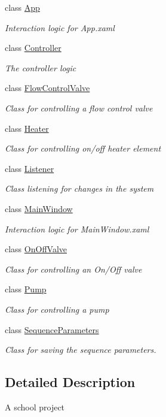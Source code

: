 \begin{DoxyCompactItemize}
\item 
class \hyperlink{class_a_s_e6030_1_1_app}{App}
\begin{DoxyCompactList}\small\item\em Interaction logic for App.\+xaml \end{DoxyCompactList}\item 
class \hyperlink{class_a_s_e6030_1_1_controller}{Controller}
\begin{DoxyCompactList}\small\item\em The controller logic \end{DoxyCompactList}\item 
class \hyperlink{class_a_s_e6030_1_1_flow_control_valve}{Flow\+Control\+Valve}
\begin{DoxyCompactList}\small\item\em Class for controlling a flow control valve \end{DoxyCompactList}\item 
class \hyperlink{class_a_s_e6030_1_1_heater}{Heater}
\begin{DoxyCompactList}\small\item\em Class for controlling on/off heater element \end{DoxyCompactList}\item 
class \hyperlink{class_a_s_e6030_1_1_listener}{Listener}
\begin{DoxyCompactList}\small\item\em Class listening for changes in the system \end{DoxyCompactList}\item 
class \hyperlink{class_a_s_e6030_1_1_main_window}{Main\+Window}
\begin{DoxyCompactList}\small\item\em Interaction logic for Main\+Window.\+xaml \end{DoxyCompactList}\item 
class \hyperlink{class_a_s_e6030_1_1_on_off_valve}{On\+Off\+Valve}
\begin{DoxyCompactList}\small\item\em Class for controlling an On/\+Off valve \end{DoxyCompactList}\item 
class \hyperlink{class_a_s_e6030_1_1_pump}{Pump}
\begin{DoxyCompactList}\small\item\em Class for controlling a pump \end{DoxyCompactList}\item 
class \hyperlink{class_a_s_e6030_1_1_sequence_parameters}{Sequence\+Parameters}
\begin{DoxyCompactList}\small\item\em Class for saving the sequence parameters. \end{DoxyCompactList}\end{DoxyCompactItemize}


\subsection{Detailed Description}
A school project 

